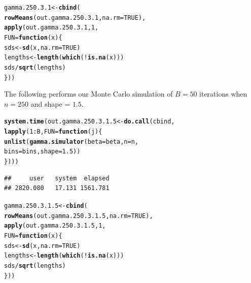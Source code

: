 \documentclass[11pt]{article}\usepackage[]{graphicx}\usepackage[]{color}
\makeatletter
\newcommand{\hlnum}[1]{\textcolor[rgb]{0.686,0.059,0.569}{#1}}%
\newcommand{\hlopt}[1]{\textcolor[rgb]{0,0,0}{#1}}%
\newcommand{\hlstd}[1]{\textcolor[rgb]{0.345,0.345,0.345}{#1}}%
\newcommand{\hlkwa}[1]{\textcolor[rgb]{0.161,0.373,0.58}{\textbf{#1}}}%
\newcommand{\hlkwb}[1]{\textcolor[rgb]{0.69,0.353,0.396}{#1}}%
\newcommand{\hlkwc}[1]{\textcolor[rgb]{0.333,0.667,0.333}{#1}}%
\newcommand{\hlkwd}[1]{\textcolor[rgb]{0.737,0.353,0.396}{\textbf{#1}}}%
\newenvironment{kframe}{%
 \def\at@end@of@kframe{}%
 \ifinner\ifhmode%
  \def\at@end@of@kframe{\end{minipage}}%
  \begin{minipage}{\columnwidth}%
 \fi\fi%
 \def\FrameCommand##1{\hskip\@totalleftmargin \hskip-\fboxsep
 \colorbox{shadecolor}{##1}\hskip-\fboxsep
     \hskip-\linewidth \hskip-\@totalleftmargin \hskip\columnwidth}%
 \MakeFramed {\advance\hsize-\width
   \@totalleftmargin\z@ \linewidth\hsize
   \@setminipage}}%
 {\par\unskip\endMakeFramed%
 \at@end@of@kframe}
\newenvironment{knitrout}{}{} %
\makeatother
\begin{document}
\begin{knitrout}
\color{fgcolor}\begin{kframe}
\begin{alltt}
\hlstd{gamma.250.3.1} \hlkwb{<-} \hlkwd{cbind}\hlstd{(}
  \hlkwd{rowMeans}\hlstd{(out.gamma.250.3.1,} \hlkwc{na.rm} \hlstd{=} \hlnum{TRUE}\hlstd{),}
  \hlkwd{apply}\hlstd{(out.gamma.250.3.1,} \hlnum{1}\hlstd{,}
  \hlkwc{FUN} \hlstd{=} \hlkwa{function}\hlstd{(}\hlkwc{x}\hlstd{)\{}
    \hlstd{sds} \hlkwb{<-} \hlkwd{sd}\hlstd{(x,} \hlkwc{na.rm} \hlstd{=} \hlnum{TRUE}\hlstd{)}
    \hlstd{lengths} \hlkwb{<-} \hlkwd{length}\hlstd{(}\hlkwd{which}\hlstd{(}\hlopt{!}\hlkwd{is.na}\hlstd{(x)))}
    \hlstd{sds} \hlopt{/} \hlkwd{sqrt}\hlstd{(lengths)}
  \hlstd{\}))}
\end{alltt}
\end{kframe}
\end{knitrout}

The following performs our Monte Carlo simulation of $B = 50$ iterations 
when $n = 250$ and shape = $1.5$.

\begin{knitrout}
\color{fgcolor}\begin{kframe}
\begin{alltt}
\hlkwd{system.time}\hlstd{(out.gamma.250.3.1.5} \hlkwb{<-} \hlkwd{do.call}\hlstd{(cbind,}
  \hlkwd{lapply}\hlstd{(}\hlnum{1}\hlopt{:}\hlstd{B,} \hlkwc{FUN} \hlstd{=} \hlkwa{function}\hlstd{(}\hlkwc{j}\hlstd{)\{}
    \hlkwd{unlist}\hlstd{(}\hlkwd{gamma.simulator}\hlstd{(}\hlkwc{beta} \hlstd{= beta,} \hlkwc{n} \hlstd{= n,}
      \hlkwc{bins} \hlstd{= bins,} \hlkwc{shape} \hlstd{=} \hlnum{1.5}\hlstd{))}
\hlstd{\})))}
\end{alltt}
\begin{verbatim}
##     user   system  elapsed 
## 2820.080   17.131 1561.781
\end{verbatim}
\end{kframe}
\end{knitrout}

\begin{knitrout}
\color{fgcolor}\begin{kframe}
\begin{alltt}
\hlstd{gamma.250.3.1.5} \hlkwb{<-} \hlkwd{cbind}\hlstd{(}
  \hlkwd{rowMeans}\hlstd{(out.gamma.250.3.1.5,} \hlkwc{na.rm} \hlstd{=} \hlnum{TRUE}\hlstd{),}
  \hlkwd{apply}\hlstd{(out.gamma.250.3.1.5,} \hlnum{1}\hlstd{,}
  \hlkwc{FUN} \hlstd{=} \hlkwa{function}\hlstd{(}\hlkwc{x}\hlstd{)\{}
    \hlstd{sds} \hlkwb{<-} \hlkwd{sd}\hlstd{(x,} \hlkwc{na.rm} \hlstd{=} \hlnum{TRUE}\hlstd{)}
    \hlstd{lengths} \hlkwb{<-} \hlkwd{length}\hlstd{(}\hlkwd{which}\hlstd{(}\hlopt{!}\hlkwd{is.na}\hlstd{(x)))}
    \hlstd{sds} \hlopt{/} \hlkwd{sqrt}\hlstd{(lengths)}
  \hlstd{\}))}
\end{alltt}
\end{kframe}
\end{knitrout}
\end{document}
